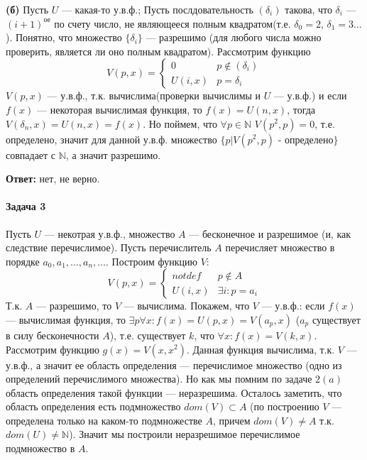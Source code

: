 \documentclass{article}
\newcommand{\N}{\mathbb{N}}
\begin{document}
        \textbf{(б)} Пусть $U$ --- какая-то у.в.ф.; Пусть послдовательность $(\delta_i)$ такова, что $\delta_i$ --- $(i + 1)^{\text{ое}}$ по счету число, не являющееся полным квадратом(т.е. $\delta_0 = 2$, $\delta_1 = 3 ...$). Понятно, что множество $\{\delta_i\}$ --- разрешимо (для любого числа можно проверить, является ли оно полным квадратом). Рассмотрим функцию
            \begin{equation*}
             V(p, x) = 
             \begin{cases} 
               0 &\text{$p \notin (\delta_i)$}\\
               U(i, x) &\text{$p = \delta_i$}
             \end{cases}
            \end{equation*}
        $V(p, x)$ --- у.в.ф., т.к. вычислима(проверки вычислимы и $U$ --- у.в.ф.) и если $f(x)$ --- некоторая вычислимая функция, то $f(x) = U(n, x)$, тогда $V(\delta_n, x) = U(n, x) = f(x)$. Но поймем, что $\forall p \in \N$ $V(p^2, p) = 0$, т.е. определено, значит для данной у.в.ф. множество $\{p | V(p^2, p)$ - определено$\}$ совпадает с $\N$, а значит разрешимо.

        \textbf{Ответ:} нет, не верно.

	\paragraph{Задача 3}
		Пусть $U$ --- некотрая у.в.ф., множество $A$ --- бесконечное и разрешимое (и, как следствие перечислимое). Пусть перечислитель $A$ перечисляет множество в порядке $a_0, a_1, \ldots, a_n, \ldots$. Построим функцию $V$:
            \begin{equation*}
             V(p, x) = 
             \begin{cases} 
               notdef &\text{$p \notin A$}\\
               U(i, x) &\text{$\exists i:p = a_i$}
             \end{cases}
            \end{equation*}
        Т.к. $A$ --- разрешимо, то $V$ --- вычислима. Покажем, что $V$ --- у.в.ф.: если $f(x)$ --- вычислимая функция, то $\exists p \forall x: f(x) = U(p, x) = V(a_p, x)$ ($a_p$ существует в силу бесконечности $A$), т.е. существует $k$, что $\forall x: f(x) = V(k, x)$. Рассмотрим функцию $g(x) = V(x, x^2)$. Данная функция вычислима, т.к. $V$ --- у.в.ф., а значит ее область определения --- перечислимое множество (одно из определений перечислимого множества). Но как мы помним по задаче $2(a)$ область определения такой функции --- неразрешима. Осталось заметить, что область определения есть подмножество $dom(V) \subset A$ (по построению $V$ --- определена только на каком-то подмножестве $A$, причем $dom(V) \ne A$ т.к. $dom(U) \ne \N$). Значит мы построили неразрешимое перечислимое подмножество в $A$.
\end{document}
